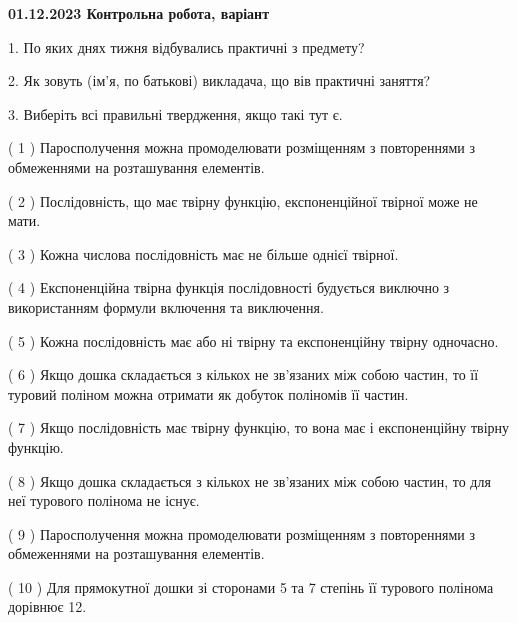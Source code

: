 \documentclass[12pt, ukrainian]{article}
\begin{document}
\vspace{4mm}
\newpage
\begin {large}

\textbf{01.12.2023 Контрольна робота, варіант  }\par


{
1. По яких днях тижня відбувались практичні з предмету?



\vspace{5mm}
2. Як зовуть (ім'я, по батькові) викладача, що вів практичні заняття?



\vspace{5mm}
3. Виберіть всі правильні твердження, якщо такі тут є.\par
\vspace{2mm}
( 1 ) Паросполучення можна промоделювати розміщенням з повтореннями з обмеженнями на розташування елементів.%

( 2 ) Послідовність, що має твірну функцію, експоненційної твірної може не мати.%

( 3 ) Кожна числова послідовність має не більше однієї твірної.%

( 4 ) Експоненційна твірна функція послідовності будується виключно з використанням формули включення та виключення.%

( 5 ) Кожна послідовність має або ні твірну та експоненційну твірну одночасно.%

( 6 ) Якщо дошка складається з кількох не зв’язаних між собою частин, то її туровий поліном можна отримати як добуток поліномів її частин.%

( 7 ) Якщо послідовність має твірну функцію, то вона має і експоненційну твірну функцію.%

( 8 ) Якщо дошка складається з кількох не зв’язаних між собою частин, то для неї турового полінома не існує.%

( 9 ) Паросполучення можна промоделювати розміщенням з повтореннями з обмеженнями на розташування елементів.%

( 10 ) Для прямокутної дошки зі сторонами 5 та 7 степінь її турового полінома дорівнює 12.%
}
\end {large}
\end{document}
